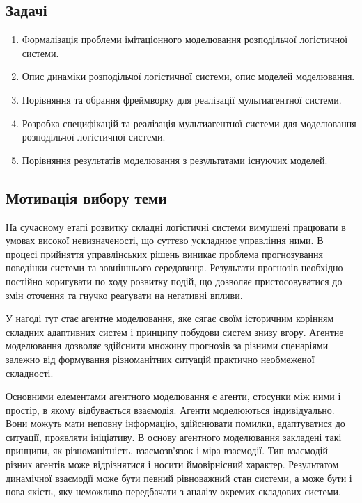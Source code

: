 \subsection*{Задачі}
\begin{enumerate}
	\item Формалізація проблеми імітаціонного моделювання розподільчої логістичної системи.
	\item Опис динаміки розподільчої логістичної системи, опис моделей моделювання.
	\item Порівняння та обрання фреймворку для реалізації мультиагентної системи.
	\item Розробка специфікацій та реалізація мультиагентної системи для моделювання розподільчої логістичної системи. 
	\item Порівняння результатів моделювання з результатами існуючих моделей.
\end{enumerate}

\subsection*{Мотивація вибору теми}
На сучасному етапі розвитку складні логістичні системи вимушені працювати в умовах високої невизначеності, що суттєво ускладнює управління ними. 
В процесі прийняття управлінських рішень виникає проблема прогнозування поведінки системи та зовнішнього середовища. 
Результати прогнозів необхідно постійно коригувати по ходу розвитку подій, що дозволяє пристосовуватися до змін оточення та гнучко реагувати на негативні впливи. 

У нагоді тут стає агентне моделювання, яке сягає своїм історичним корінням складних адаптивних систем і принципу побудови систем знизу вгору.
Агентне моделювання дозволяє здійснити множину прогнозів за різними сценаріями залежно від формування різноманітних ситуацій практично необмеженої складності. 

Основними елементами агентного моделювання є агенти, стосунки між ними і простір, в якому відбувається взаємодія. 
Агенти моделюються індивідуально. 
Вони можуть мати неповну інформацію, здійснювати помилки, адаптуватися до ситуації, проявляти ініціативу. 
В основу агентного моделювання закладені такі принципи, як різноманітність, взаємозв’язок і міра взаємодії. 
Тип взаємодій різних агентів може відрізнятися і носити ймовірнісний характер. 
Результатом динамічної взаємодії може бути певний рівноважний стан системи, а може бути і нова якість, яку неможливо передбачати з аналізу окремих складових системи.

